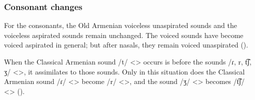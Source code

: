 \subsubsection{Consonant changes}

For the consonants, the Old Armenian voiceless unaspirated sounds and the voiceless aspirated sounds remain unchanged. The voiced sounds have become voiced aspirated in general; but after nasals, they remain voiced unaspirated (). 




\begin{table}[H]
	\centering
	\caption{Voicing changes for stops and affricates in the Karin dialect}
	\label{tab:Karin:phono:change:cons:voice}
\end{table}


When the Classical Armenian sound /t/ <> occurs is before the sounds /ɾ, r, t͡ʃ, ʒ/ <>, it assimilates to those sounds. Only in this situation does the Classical Armenian sound /ɾ/ <> become /r/ <>, and the sound /ʒ/ <> becomes /t͡ʃ/ <> (). 




